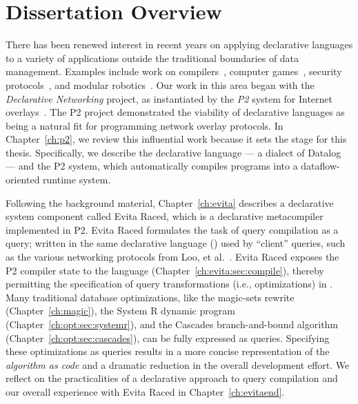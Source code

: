 \chapter[Dissertation Overview]{Dissertation Overview}
\label{ch:overview}

There has been renewed interest in recent years on applying declarative
languages to a variety of applications outside the traditional boundaries of
data management.  Examples include work on compilers~\cite{lam05context},
computer games~\cite{white-sigmod07}, security protocols~\cite{li-padl03}, and
modular robotics~\cite{ashley-iros07}.  Our work in this area began with the
{\em Declarative Networking} project, as instantiated by the {\em P2} system
for Internet overlays~\cite{p2:sosp, loo-sigmod06}.  The P2 project
demonstrated the viability of declarative languages as being a natural fit for
programming network overlay protocols.  In Chapter~\ref{ch:p2}, we review this
influential work because it sets the stage for this thesis.  Specifically, we
describe the declarative language \OVERLOG\@ --- a dialect of Datalog --- and the
P2 system, which automatically compiles \OVERLOG programs into a
dataflow-oriented runtime system.

Following the background material, Chapter~\ref{ch:evita} describes a
declarative system component called Evita Raced, which is a declarative
metacompiler implemented in P2.  Evita Raced formulates the task of query
compilation as a query; written in the same declarative language (\OVERLOG)
used by ``client'' queries, such as the various networking protocols from Loo,
et al.~\cite{loo-sigmod06, p2:sosp}.  Evita Raced exposes the P2 compiler state
to the \OVERLOG language (Chapter~\ref{ch:evita:sec:compile}), thereby
permitting the specification of query transformations (i.e., optimizations) in
\OVERLOG.  Many traditional database optimizations, like the magic-sets rewrite
(Chapter~\ref{ch:magic}), the System R dynamic program
(Chapter~\ref{ch:opt:sec:systemr}), and the Cascades branch-and-bound algorithm
(Chapter~\ref{ch:opt:sec:cascades}), can be fully expressed as \OVERLOG
queries.  Specifying these optimizations as \OVERLOG queries results in a more
concise representation of the {\em algorithm as code} and a dramatic reduction
in the overall development effort.  We reflect on the practicalities of a
declarative approach to query compilation and our overall experience with Evita
Raced in Chapter~\ref{ch:evitaend}.
 

